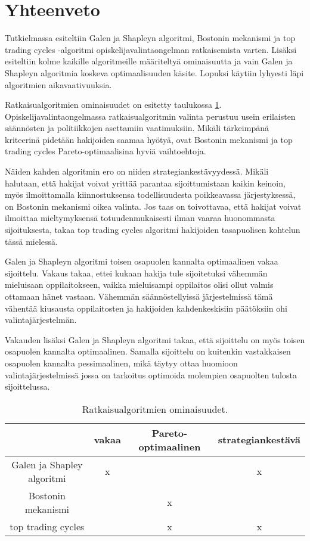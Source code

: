 \documentclass[gradu, twoside]{tktltiki}
\begin{document}
\section{Yhteenveto}

Tutkielmassa esiteltiin Galen ja Shapleyn algoritmi, Bostonin
mekanismi ja top trading cycles -algoritmi opiskelijavalintaongelman
ratkaisemista varten. Lisäksi esiteltiin kolme kaikille algoritmeille
määriteltyä ominaisuutta ja vain Galen ja Shapleyn algoritmia koskeva
optimaalisuuden käsite. Lopuksi käytiin lyhyesti läpi algoritmien
aikavaativuuksia.

Ratkaisualgoritmien ominaisuudet on esitetty taulukossa
\ref{algoritmi_ominaisuudet}. Opiskelijavalintaongelmassa
ratkaisualgoritmin valinta perustuu usein erilaisten säännösten ja
politiikkojen asettamiin vaatimuksiin. Mikäli tärkeimpänä kriteerinä
pidetään hakijoiden saamaa hyötyä, ovat Bostonin mekanismi ja top
trading cycles Pareto-optimaalisina hyviä vaihtoehtoja.

Näiden kahden algoritmin ero on niiden strategiankestävyydessä. Mikäli
halutaan, että hakijat voivat yrittää parantaa sijoittumistaan kaikin
keinoin, myös ilmoittamalla kiinnostuksensa todellisuudesta
poikkeavassa järjestyksessä, on Bostonin mekanismi oikea valinta. Jos
taas on toivottavaa, että hakijat voivat ilmoittaa mieltymyksensä
totuudenmukaisesti ilman vaaraa huonommasta sijoituksesta, takaa top
trading cycles algoritmi hakijoiden tasapuolisen kohtelun tässä
mielessä.

Galen ja Shapleyn algoritmi toisen osapuolen kannalta optimaalinen
vakaa sijoittelu. Vakaus takaa, ettei kukaan hakija tule sijoitetuksi
vähemmän mieluisaan oppilaitokseen, vaikka mieluisampi oppilaitos
olisi ollut valmis ottamaan hänet vastaan. Vähemmän säännöstellyissä
järjestelmissä tämä vähentää kiusausta oppilaitosten ja hakijoiden
kahdenkeskisiin päätöksiin ohi valintajärjestelmän.

Vakauden lisäksi Galen ja Shapleyn algoritmi takaa, että sijoittelu on
myös toisen osapuolen kannalta optimaalinen. Samalla sijoittelu on
kuitenkin vastakkaisen osapuolen kannalta pessimaalinen, mikä täytyy
ottaa huomioon valintajärjestelmissä jossa on tarkoitus optimoida
molempien osapuolten tulosta sijoittelussa.

\begin{table}[]
  \begin{center}
    \begin{tabular}{ c | c c c }
      & vakaa & Pareto-optimaalinen & strategiankestävä \\
      \hline
      Galen ja Shapley algoritmi & x & & x \\
      Bostonin mekanismi & & x & \\
      top trading cycles & & x & x \\
    \end{tabular}
    \caption{Ratkaisualgoritmien ominaisuudet.}
    \label{algoritmi_ominaisuudet}
  \end{center}
\end{table}
\end{document}
